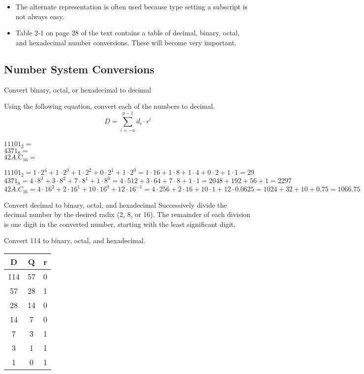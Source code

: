 \begin{itemize}
  \item The alternate representation is often used because type setting a subscript is not always easy.
  \item Table 2-1 on page 28 of the text contains a table of decimal, binary, octal, and hexadecimal number conversions.  These will become very important.
\end{itemize}

\subsection{Number System Conversions}

\begin{frame}{Convert binary, octal, or hexadecimal to decimal}
  \begin{example}
    Using the following equation, convert each of the numbers to decimal.
    $$D=\sum_{i=-n}^{p-1}d_i \cdot r^i$$
    \\
    $11101_2 =$
    \\
    $4371_8 =$
    \\
    $42A.\text{C}_{16} =$
  \end{example}
\end{frame}

$$11101_2 = 1 \cdot 2^4 + 1 \cdot 2^3 + 1 \cdot 2^2 + 0 \cdot 2^1 + 1 \cdot 2^0 = 1 \cdot 16 + 1 \cdot 8 + 1 \cdot 4 + 0 \cdot 2 + 1 \cdot 1 = 29$$
$$4371_8 = 4 \cdot 8^3 + 3 \cdot 8^2 + 7 \cdot 8^1 + 1 \cdot 8^0 = 4 \cdot 512 + 3 \cdot 64 + 7 \cdot 8 + 1 \cdot 1 = 2048 + 192 + 56 + 1 = 2297$$
$$42A.C_{16} = 4 \cdot 16^2 + 2 \cdot 16^1 + 10 \cdot 16^0 + 12 \cdot 16^{-1} = 4 \cdot 256 + 2 \cdot 16 + 10 \cdot 1 + 12 \cdot 0.0625 = 1024 + 32 + 10 + 0.75 = 1066.75$$

\begin{frame}{Convert decimal to binary, octal, and hexadecimal}
    Successively divide the decimal number by the desired radix (2, 8, or 16).  The remainder of each division is one digit in the converted number, starting with the least significant digit.
  \begin{example}
    Convert 114 to binary, octal, and hexadecimal.\\
    \begin{center}
      \begin{tabular}{c|cc}
        D & Q & r\\
        \hline
        114 & 57 & 0\\
        57 & 28 & 1\\
        28 & 14 & 0\\
        14 & 7 & 0\\
        7 & 3 & 1\\
        3 & 1  & 1\\
        1 & 0 & 1\\
      \end{tabular}
    \end{center}
  \end{example}
\end{frame}

